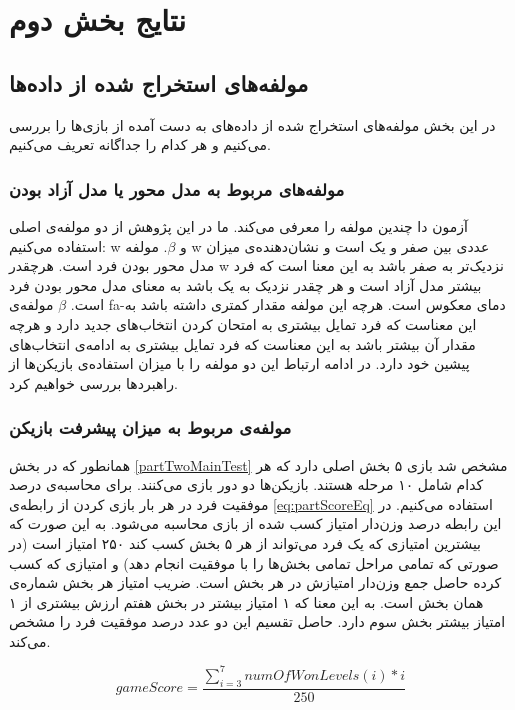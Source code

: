 \documentclass[twoside, a4paper,11pt]{book}
\numberwithin{equation}{chapter}
\numberwithin{table}{chapter}
\numberwithin{figure}{chapter}
\numberwithin{equation}{chapter}
\newcommand{\mls}[1]{\gls{fa-#1}\glsuseri{la-#1}}
\begin{document}
\section{نتایج بخش دوم}

\subsection{مولفه‌های استخراج شده از داده‌ها}
در این بخش مولفه‌های استخراج شده از داده‌های به دست آمده از بازی‌ها را بررسی می‌کنیم و هر کدام را جداگانه تعریف می‌کنیم.
\subsubsection{مولفه‌های مربوط به مدل محور یا مدل آزاد بودن}

آزمون دا چندین مولفه را معرفی می‌کند. ما در این پژوهش از دو مولفه‌ی اصلی استفاده می‌کنیم: w و $\beta$. مولفه w عددی بین صفر و یک است و نشان‌دهنده‌ی میزان مدل محور بودن فرد است. هرچقدر w نزدیک‌تر به صفر باشد به این معنا است که فرد بیشتر مدل آزاد است و هر چقدر نزدیک به یک باشد به معنای مدل محور بودن فرد است. $\beta$ مولفه‌ی \mls{دمای معکوس} است. هرچه این مولفه مقدار کمتری داشته باشد به این معناست که فرد تمایل بیشتری به امتحان کردن انتخاب‌های جدید دارد و هرچه مقدار آن بیشتر باشد به این معناست که فرد تمایل بیشتری به ادامه‌ی انتخاب‌های پیشین خود دارد. در ادامه ارتباط این دو مولفه را با میزان استفاده‌ی بازیکن‌ها از راهبردها بررسی خواهیم کرد. 
\subsubsection{مولفه‌ی مربوط به میزان پیشرفت بازیکن}
همانطور که در بخش \ref{partTwoMainTest} مشخص شد بازی ۵ بخش اصلی دارد که هر کدام شامل ۱۰ مرحله هستند. بازیکن‌ها دو دور بازی می‌کنند. برای محاسبه‌ی درصد موفقیت فرد در هر بار بازی کردن از رابطه‌ی \ref{eq:partScoreEq} استفاده می‌کنیم. در این رابطه درصد وزن‌دار امتیاز کسب شده از بازی محاسبه می‌شود. به این صورت که بیشترین امتیازی که یک فرد می‌تواند از هر ۵ بخش کسب کند ۲۵۰ امتیاز است (در صورتی که تمامی مراحل تمامی بخش‌ها را با موفقیت انجام دهد) و امتیازی که کسب کرده حاصل جمع وزن‌دار امتیازش در هر بخش است. ضریب امتیاز هر بخش شماره‌ی همان بخش است. به این معنا که ۱ امتیاز بیشتر در بخش هفتم ارزش بیشتری از ۱ امتیاز بیشتر بخش سوم دارد. حاصل تقسیم این دو عدد درصد موفقیت فرد را مشخص می‌کند.

\begin{equation}
\label{eq:partScoreEq}
	gameScore = \frac{\sum_{i=3}^{7} numOfWonLevels(i)*i }{250}
\end{equation}
\end{document}
